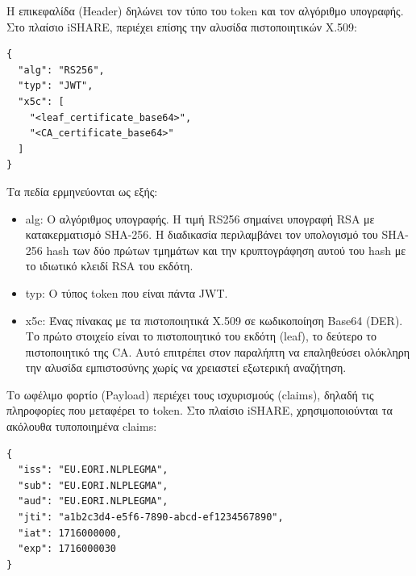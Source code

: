 Η επικεφαλίδα (\textlatin{Header}) δηλώνει τον τύπο του \textlatin{token} και τον αλγόριθμο
υπογραφής. Στο πλαίσιο \textlatin{iSHARE}, περιέχει επίσης την αλυσίδα
πιστοποιητικών \textlatin{X.509}:

\begin{lstlisting}[language={}, caption={Header ενός iSHARE JWT.}]
{
  "alg": "RS256",
  "typ": "JWT",
  "x5c": [
    "<leaf_certificate_base64>",
    "<CA_certificate_base64>"
  ]
}
\end{lstlisting}

Τα πεδία ερμηνεύονται ως εξής:
\begin{itemize}
    \item \textlatin{alg}: Ο αλγόριθμος υπογραφής. Η τιμή \textlatin{RS256}
    σημαίνει υπογραφή \textlatin{RSA} με κατακερματισμό \textlatin{SHA-256}.
    Η διαδικασία περιλαμβάνει τον υπολογισμό του \textlatin{SHA-256 hash}
    των δύο πρώτων τμημάτων και την κρυπτογράφηση αυτού του \textlatin{hash}
    με το ιδιωτικό κλειδί \textlatin{RSA} του εκδότη.
    \item \textlatin{typ}: Ο τύπος \textlatin{token} που είναι πάντα \textlatin{JWT}.
    \item \textlatin{x5c}: Ένας πίνακας με τα
    πιστοποιητικά \textlatin{X.509} σε κωδικοποίηση \textlatin{Base64}
    (\textlatin{DER}). Το πρώτο στοιχείο είναι το πιστοποιητικό του εκδότη
    (\textlatin{leaf}), το δεύτερο το πιστοποιητικό της \textlatin{CA}.
    Αυτό επιτρέπει στον παραλήπτη να επαληθεύσει ολόκληρη την αλυσίδα
    εμπιστοσύνης χωρίς να χρειαστεί εξωτερική αναζήτηση.
\end{itemize}

Το ωφέλιμο φορτίο (\textlatin{Payload}) περιέχει τους ισχυρισμούς (\textlatin{claims}), δηλαδή
τις πληροφορίες που μεταφέρει το \textlatin{token}. Στο πλαίσιο
\textlatin{iSHARE}, χρησιμοποιούνται τα ακόλουθα τυποποιημένα
\textlatin{claims}:

\begin{lstlisting}[language={}, caption={Payload ενός iSHARE JWT.}]
{
  "iss": "EU.EORI.NLPLEGMA",
  "sub": "EU.EORI.NLPLEGMA",
  "aud": "EU.EORI.NLPLEGMA",
  "jti": "a1b2c3d4-e5f6-7890-abcd-ef1234567890",
  "iat": 1716000000,
  "exp": 1716000030
}
\end{lstlisting}

